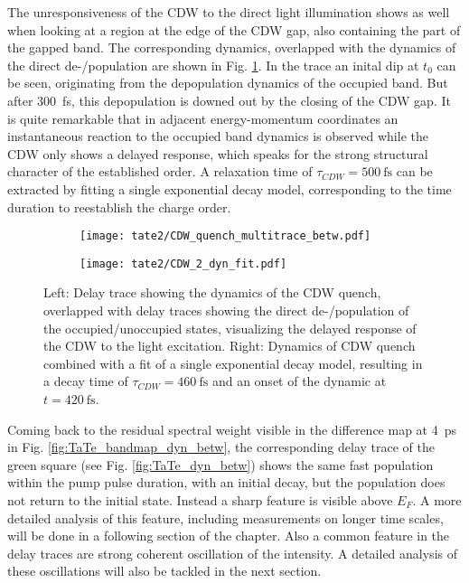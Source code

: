 The unresponsiveness of the CDW to the direct light illumination shows as well when looking at a region at the edge of the CDW gap, also containing the part of the gapped band.
The corresponding dynamics, overlapped with the dynamics of the direct de-/population are shown in Fig. \ref{fig:TaTe_CDW_comp}.
In the trace an inital dip at $t_0$ can be seen, originating from the depopulation dynamics of the occupied band.
But after \SI{300}{\femto\second}, this depopulation is downed out by the closing of the CDW gap.
It is quite remarkable that in adjacent energy-momentum coordinates an instantaneous reaction to the occupied band dynamics is observed while the CDW only shows a delayed response, which speaks for the strong structural character of the established order.
A relaxation time of $\tau_{CDW}=\SI{500}{\femto\second}$ can be extracted by fitting a single exponential decay model, corresponding to the time duration to reestablish the charge order.

\begin{figure}[t!]
	\centering
	\begin{subfigure}[b]{0.33\textwidth}
		\texttt{[image: tate2/CDW\_quench\_multitrace\_betw.pdf]}
		\caption{}
	\end{subfigure}
	\begin{subfigure}[b]{0.33\textwidth}
		\texttt{[image: tate2/CDW\_2\_dyn\_fit.pdf]}
		\caption{}
	\end{subfigure}
	\caption{Left: Delay trace showing the dynamics of the CDW quench, overlapped with delay traces showing the direct de-/population of the occupied/unoccupied states, visualizing the delayed response of the CDW to the light excitation. Right: Dynamics of CDW quench combined with a fit of a single exponential decay model, resulting in a decay time of $\tau_{CDW}=\SI{460}{\femto\second}$ and an onset of the dynamic at $t=\SI{420}{\femto\second}$.}
	\label{fig:TaTe_CDW_comp}
\end{figure}

Coming back to the residual spectral weight visible in the difference map at \SI{4}{\pico\second} in Fig. \ref{fig:TaTe_bandmap_dyn_betw}, the corresponding delay trace of the green square (see Fig. \ref{fig:TaTe_dyn_betw}) shows the same fast population within the pump pulse duration, with an initial decay, but the population does not return to the initial state.
Instead a sharp feature is visible above $E_F$.
A more detailed analysis of this feature, including measurements on longer time scales, will be done in a following section of the chapter.
Also a common feature in the delay traces are strong coherent oscillation of the intensity.
A detailed analysis of these oscillations will also be tackled in the next section.

